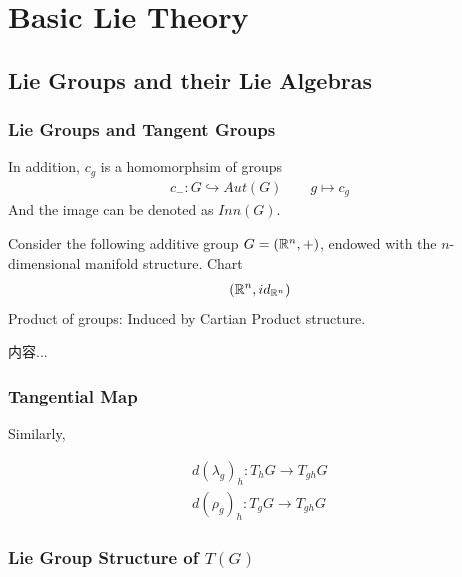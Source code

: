 \documentclass[Total.tex]{subfiles}
\begin{document}
	\chapter{Basic Lie Theory}
		\section{Lie Groups and their Lie Algebras}
			\subsection{Lie Groups and Tangent Groups}
				
				
				
				In addition, $c_g$ is a homomorphsim of groups
				\begin{gather*}
					c_{-}:G\hookrightarrow Aut(G)\qquad g\mapsto c_g
				\end{gather*}
				And the image can be denoted as $Inn(G)$.
				
				\begin{example}
					Consider the following additive group $G=(\mathbb{R}^n,+)$, endowed with the $n$-dimensional manifold structure. Chart
					\begin{gather*}
						(\mathbb{R}^n,id_{\mathbb{R}^n})
					\end{gather*}
					Product of groups: Induced by Cartian Product structure.
				\end{example}
				\begin{example}
					内容...
				\end{example}
				
				\subsection{Tangential Map}
				
				Similarly,
				
				\begin{gather*}
					d(\lambda_g)_h:T_h G\rightarrow T_{gh} G\\
					d(\rho_g)_h:T_g G\rightarrow T_{gh}G
				\end{gather*}
				
				\subsection{Lie Group Structure of $T(G)$}
				
\end{document}
